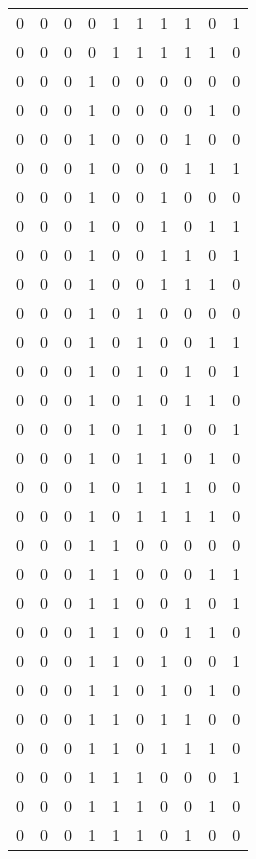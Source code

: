 \begin{longtable}[c]{rrrrrrrrrr}
        0 & 0 & 0 & 0 & 1 & 1 & 1 & 1 & 0 & 1 \\
        0 & 0 & 0 & 0 & 1 & 1 & 1 & 1 & 1 & 0 \\
        0 & 0 & 0 & 1 & 0 & 0 & 0 & 0 & 0 & 0 \\
        0 & 0 & 0 & 1 & 0 & 0 & 0 & 0 & 1 & 0 \\
        0 & 0 & 0 & 1 & 0 & 0 & 0 & 1 & 0 & 0 \\
        0 & 0 & 0 & 1 & 0 & 0 & 0 & 1 & 1 & 1 \\
        0 & 0 & 0 & 1 & 0 & 0 & 1 & 0 & 0 & 0 \\
        0 & 0 & 0 & 1 & 0 & 0 & 1 & 0 & 1 & 1 \\
        0 & 0 & 0 & 1 & 0 & 0 & 1 & 1 & 0 & 1 \\
        0 & 0 & 0 & 1 & 0 & 0 & 1 & 1 & 1 & 0 \\
        0 & 0 & 0 & 1 & 0 & 1 & 0 & 0 & 0 & 0 \\
        0 & 0 & 0 & 1 & 0 & 1 & 0 & 0 & 1 & 1 \\
        0 & 0 & 0 & 1 & 0 & 1 & 0 & 1 & 0 & 1 \\
        0 & 0 & 0 & 1 & 0 & 1 & 0 & 1 & 1 & 0 \\
        0 & 0 & 0 & 1 & 0 & 1 & 1 & 0 & 0 & 1 \\
        0 & 0 & 0 & 1 & 0 & 1 & 1 & 0 & 1 & 0 \\
        0 & 0 & 0 & 1 & 0 & 1 & 1 & 1 & 0 & 0 \\
        0 & 0 & 0 & 1 & 0 & 1 & 1 & 1 & 1 & 0 \\
        0 & 0 & 0 & 1 & 1 & 0 & 0 & 0 & 0 & 0 \\
        0 & 0 & 0 & 1 & 1 & 0 & 0 & 0 & 1 & 1 \\
        0 & 0 & 0 & 1 & 1 & 0 & 0 & 1 & 0 & 1 \\
        0 & 0 & 0 & 1 & 1 & 0 & 0 & 1 & 1 & 0 \\
        0 & 0 & 0 & 1 & 1 & 0 & 1 & 0 & 0 & 1 \\
        0 & 0 & 0 & 1 & 1 & 0 & 1 & 0 & 1 & 0 \\
        0 & 0 & 0 & 1 & 1 & 0 & 1 & 1 & 0 & 0 \\
        0 & 0 & 0 & 1 & 1 & 0 & 1 & 1 & 1 & 0 \\
        0 & 0 & 0 & 1 & 1 & 1 & 0 & 0 & 0 & 1 \\
        0 & 0 & 0 & 1 & 1 & 1 & 0 & 0 & 1 & 0 \\
        0 & 0 & 0 & 1 & 1 & 1 & 0 & 1 & 0 & 0 \\

\end{longtable}
